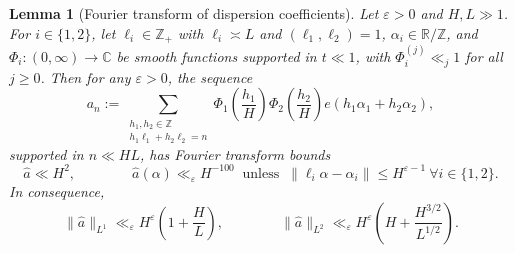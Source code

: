 \documentclass[reqno,11pt]{amsart}
\newtheorem{lemma}[theorem]{Lemma}
\theoremstyle{remark}
\numberwithin{equation}{section}
\newcommand{\Z}{\mathbb{Z}}
\newcommand{\R}{\mathbb{R}}
\newcommand{\C}{\mathbb{C}}
\newcommand{\eps}{\varepsilon}
\renewcommand{\hat}{\widehat}
\begin{document}
\begin{lemma}[Fourier transform of dispersion coefficients] \label{lem:fourier-dispersion}
Let $\eps > 0$ and $H, L \gg 1$.
For $i \in \{1, 2\}$, let $\ell_i \in \Z_+$ with $\ell_i \asymp L$ and $(\ell_1, \ell_2) = 1$, $\alpha_i \in \R/\Z$,
and $\Phi_i : (0, \infty) \to \C$ be smooth functions supported in $t \ll 1$, with $\Phi_i^{(j)} \ll_j 1$ for all $j \ge 0$. Then for any $\eps > 0$, the sequence 
\[
    a_n := \sum_{\substack{h_1, h_2 \in \Z \\ h_1 \ell_1 + h_2 \ell_2 = n}} \Phi_1\left(\frac{h_1}{H}\right) \Phi_2\left(\frac{h_2}{H}\right) e(h_1 \alpha_1 + h_2 \alpha_2),
\]
supported in $n \ll HL$, has Fourier transform bounds
\begin{equation} \label{eq:fourier-dispersion-bounds}
    \hat{a} \ll H^2, 
    \qquad\qquad 
    \hat{a}(\alpha) \ll_\eps H^{-100} \ 
    \text{ unless } \
    \|\ell_i \alpha - \alpha_i\| \le H^{\eps-1}\ 
    \forall i \in \{1, 2\}.
\end{equation}
In consequence,
\[
    \|\hat{a}\|_{L^1} \ll_\eps H^{\eps} \left(1 + \frac{H}{L}\right),
    \qquad\qquad 
    \|\hat{a}\|_{L^2} \ll_\eps H^{\eps} \left(H + \frac{H^{3/2}}{L^{1/2}}\right).
\]
\end{lemma}
\end{document}
